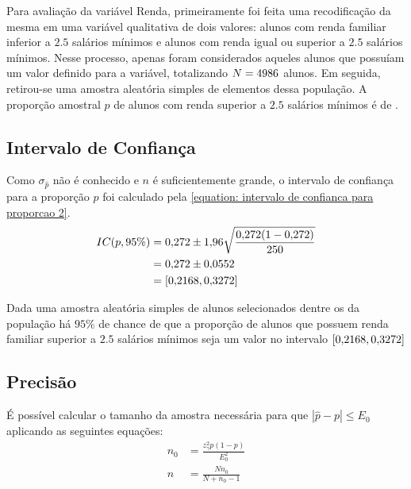 

Para avaliação da variável Renda, primeiramente foi feita uma recodificação
da mesma em uma variável qualitativa de dois valores: alunos com renda
familiar inferior a $\num{2,5}$ salários mínimos e alunos com renda igual ou
superior a $\num{2,5}$ salários mínimos. Nesse processo, apenas foram considerados
aqueles alunos que possuíam um valor definido para a variável, totalizando
$N=4986$ alunos. Em seguida, retirou-se uma amostra aleatória simples de
\SEISn elementos dessa população. A proporção amostral $\hat{p}$ de alunos
com renda superior a $\num{2.5}$ salários mínimos é de \SEISpAmostral.

\subsection{Intervalo de Confiança}

	Como $\sigma_{\hat{p}}$ não é conhecido e $n$ é suficientemente grande,
	o intervalo de confiança para a proporção $p$ foi calculado pela
	\autoref{equation: intervalo de confianca para proporcao 2}.
	\begin{align*}
		IC(p, 95\%) &= \num{0.272} \pm \num{1.96} \sqrt{\frac{\num{0.272} (1- \num{0.272})}{250}} \nonumber \\
					&= \num{0.272} \pm \num{0.0552} \nonumber \\
					&= [\num{0.2168}, \num{0.3272}]
	\end{align*}

	\noindent Dada uma amostra aleatória simples de \SEISn alunos
	selecionados dentre os \SEISN da população há $95\%$ de chance de que a
	proporção de alunos que possuem renda familiar superior a $\num{2,5}$ salários
	mínimos seja um valor no intervalo $[\num{0.2168}, \num{0.3272}]$

\subsection{Precisão}

	É possível calcular o tamanho da amostra necessária para que $|\hat{p}
	- p| \leq E_0$ aplicando as seguintes equações:
	\begin{align}
		n_0 &= \label{eq:seis-b-n0}
			   \frac{z_\gamma^2 p(1-p)}{E_0^2} \\
		n &= \label{eq:seis-b-n}
			 \frac{N n_0}{N + n_0 - 1} 
	\end{align}

